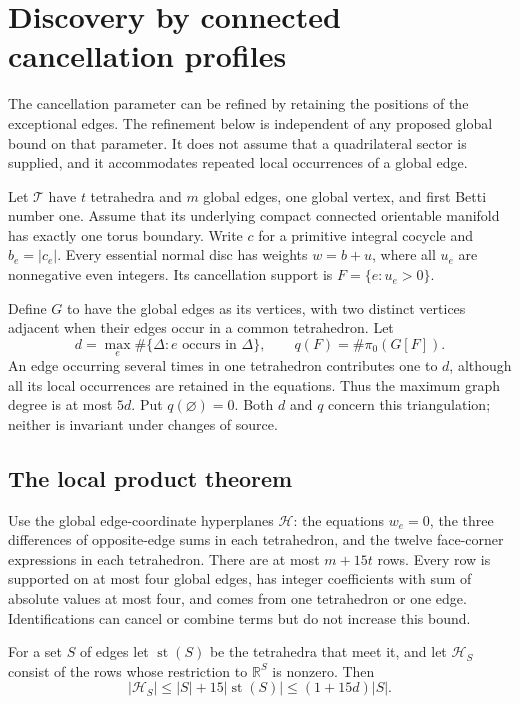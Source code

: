 \section{Discovery by connected cancellation profiles}
\label{sec:cancellation-clusters}

The cancellation parameter can be refined by retaining the positions of the
exceptional edges.  The refinement below is independent of any proposed
global bound on that parameter.  It does not assume that a quadrilateral
sector is supplied, and it accommodates repeated local occurrences of a
global edge.

Let $\mathcal T$ have $t$ tetrahedra and $m$ global edges, one global vertex,
and first Betti number one.  Assume that its underlying compact connected
orientable manifold has exactly one torus boundary.  Write $c$ for a
primitive integral cocycle and $b_e=|c_e|$.  Every essential normal disc has
weights $w=b+u$, where all $u_e$ are nonnegative even integers.  Its
cancellation support is $F=\{e:u_e>0\}$.

Define $G$ to have the global edges as its vertices, with two distinct
vertices adjacent when their edges occur in a common tetrahedron.  Let
\[
 d=\max_e\#\{\Delta:e\text{ occurs in }\Delta\},\qquad
 q(F)=\#\pi_0(G[F]).
\]
An edge occurring several times in one tetrahedron contributes one to
$d$, although all its local occurrences are retained in the equations.
Thus the maximum graph degree is at most $5d$.  Put $q(\varnothing)=0$.
Both $d$ and $q$ concern this triangulation; neither is invariant under
changes of source.

\subsection{The local product theorem}

Use the global edge-coordinate hyperplanes $\mathcal H$: the equations
$w_e=0$, the three differences of opposite-edge sums in each tetrahedron,
and the twelve face-corner expressions in each tetrahedron.  There are at
most $m+15t$ rows.  Every row is supported on at most four global edges,
has integer coefficients with sum of absolute values at most four, and
comes from one tetrahedron or one edge.  Identifications can cancel or
combine terms but do not increase this bound.

For a set $S$ of edges let $\operatorname{st}(S)$ be the tetrahedra that
meet it, and let $\mathcal H_S$ consist of the rows whose restriction to
$\mathbb R^S$ is nonzero.  Then
\begin{equation}\label{eq:cluster-row-count}
 |\mathcal H_S|\le |S|+15|\operatorname{st}(S)|
                    \le (1+15d)|S|.
\end{equation}

